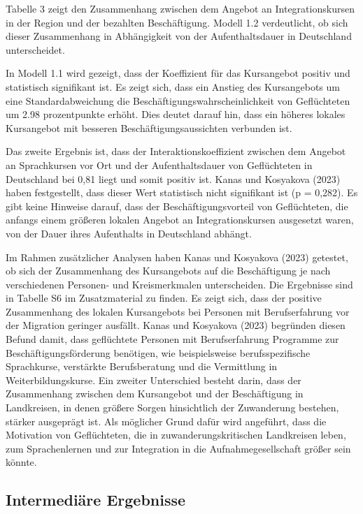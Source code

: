 Tabelle 3 zeigt den Zusammenhang zwischen dem Angebot an Integrationskursen in der Region und der bezahlten Beschäftigung. Modell 1.2 verdeutlicht, ob sich dieser Zusammenhang in Abhängigkeit von der Aufenthaltsdauer in Deutschland unterscheidet.

In Modell 1.1 wird gezeigt, dass der Koeffizient für das Kursangebot positiv und statistisch signifikant ist. Es zeigt sich, dass ein Anstieg des Kursangebots um eine Standardabweichung die Beschäftigungswahrscheinlichkeit von Geflüchteten um 2.98 prozentpunkte erhöht. Dies deutet darauf hin, dass ein höheres lokales Kursangebot mit besseren Beschäftigungsaussichten verbunden ist.

Das zweite Ergebnis ist, dass der Interaktionskoeffizient zwischen dem Angebot an Sprachkursen vor Ort und der Aufenthaltsdauer von Geflüchteten in Deutschland bei 0,81 liegt und somit positiv ist. Kanas und Kosyakova (2023) haben festgestellt, dass dieser Wert statistisch nicht signifikant ist (p = 0,282). Es gibt keine Hinweise darauf, dass der Beschäftigungsvorteil von Geflüchteten, die anfangs einem größeren lokalen Angebot an Integrationskursen ausgesetzt waren, von der Dauer ihres Aufenthalts in Deutschland abhängt.

Im Rahmen zusätzlicher Analysen haben Kanas und Kosyakova (2023) getestet, ob sich der Zusammenhang des Kursangebots auf die Beschäftigung je nach verschiedenen Personen- und Kreismerkmalen unterscheiden. Die Ergebnisse sind in Tabelle S6 im Zusatzmaterial zu finden. Es zeigt sich, dass der positive Zusammenhang des lokalen Kursangebots bei Personen mit Berufserfahrung vor der Migration geringer ausfällt. Kanas und Kosyakova (2023) begründen diesen Befund damit, dass geflüchtete Personen mit Berufserfahrung Programme zur Beschäftigungsförderung benötigen, wie beispielsweise berufsspezifische Sprachkurse, verstärkte Berufsberatung und die Vermittlung in Weiterbildungskurse. Ein zweiter Unterschied besteht darin, dass der Zusammenhang zwischen dem Kursangebot und der Beschäftigung in Landkreisen, in denen größere Sorgen hinsichtlich der Zuwanderung bestehen, stärker ausgeprägt ist. Als möglicher Grund dafür wird angeführt, dass die Motivation von Geflüchteten, die in zuwanderungskritischen Landkreisen leben, zum Sprachenlernen und zur Integration in die Aufnahmegesellschaft größer sein könnte.





\subsection{Intermedi\"are Ergebnisse}
\label{sec:erg-mechanismen}

